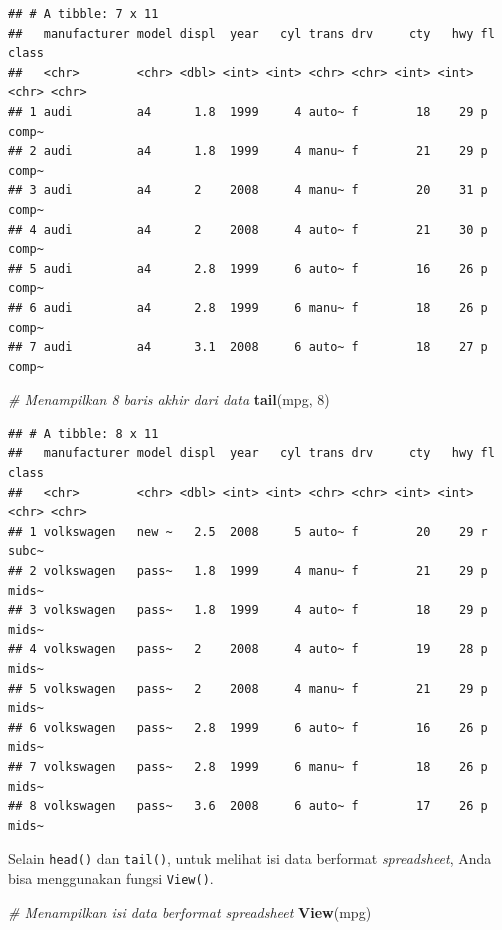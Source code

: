 \documentclass[openany]{book}
\newenvironment{Shaded}{\begin{snugshade}}{\end{snugshade}}
\newcommand{\KeywordTok}[1]{\textcolor[rgb]{0.13,0.29,0.53}{\textbf{#1}}}
\newcommand{\DecValTok}[1]{\textcolor[rgb]{0.00,0.00,0.81}{#1}}
\newcommand{\CommentTok}[1]{\textcolor[rgb]{0.56,0.35,0.01}{\textit{#1}}}
\newcommand{\NormalTok}[1]{#1}
\begin{document}
\begin{verbatim}
## # A tibble: 7 x 11
##   manufacturer model displ  year   cyl trans drv     cty   hwy fl    class
##   <chr>        <chr> <dbl> <int> <int> <chr> <chr> <int> <int> <chr> <chr>
## 1 audi         a4      1.8  1999     4 auto~ f        18    29 p     comp~
## 2 audi         a4      1.8  1999     4 manu~ f        21    29 p     comp~
## 3 audi         a4      2    2008     4 manu~ f        20    31 p     comp~
## 4 audi         a4      2    2008     4 auto~ f        21    30 p     comp~
## 5 audi         a4      2.8  1999     6 auto~ f        16    26 p     comp~
## 6 audi         a4      2.8  1999     6 manu~ f        18    26 p     comp~
## 7 audi         a4      3.1  2008     6 auto~ f        18    27 p     comp~
\end{verbatim}

\begin{Shaded}
\begin{Highlighting}[]
\CommentTok{# Menampilkan 8 baris akhir dari data}
\KeywordTok{tail}\NormalTok{(mpg, }\DecValTok{8}\NormalTok{)}
\end{Highlighting}
\end{Shaded}

\begin{verbatim}
## # A tibble: 8 x 11
##   manufacturer model displ  year   cyl trans drv     cty   hwy fl    class
##   <chr>        <chr> <dbl> <int> <int> <chr> <chr> <int> <int> <chr> <chr>
## 1 volkswagen   new ~   2.5  2008     5 auto~ f        20    29 r     subc~
## 2 volkswagen   pass~   1.8  1999     4 manu~ f        21    29 p     mids~
## 3 volkswagen   pass~   1.8  1999     4 auto~ f        18    29 p     mids~
## 4 volkswagen   pass~   2    2008     4 auto~ f        19    28 p     mids~
## 5 volkswagen   pass~   2    2008     4 manu~ f        21    29 p     mids~
## 6 volkswagen   pass~   2.8  1999     6 auto~ f        16    26 p     mids~
## 7 volkswagen   pass~   2.8  1999     6 manu~ f        18    26 p     mids~
## 8 volkswagen   pass~   3.6  2008     6 auto~ f        17    26 p     mids~
\end{verbatim}

Selain \texttt{head()} dan \texttt{tail()}, untuk melihat isi data
berformat \emph{spreadsheet}, Anda bisa menggunakan fungsi
\texttt{View()}.

\begin{Shaded}
\begin{Highlighting}[]
\CommentTok{# Menampilkan isi data berformat spreadsheet}
\KeywordTok{View}\NormalTok{(mpg)}
\end{Highlighting}
\end{Shaded}
\end{document}
